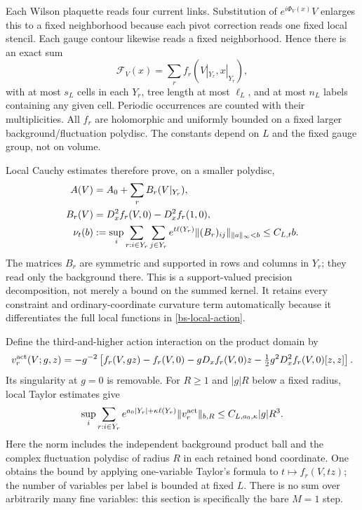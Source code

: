 Each Wilson plaquette reads four current links. Substitution of
$e^{i\Phi_V(x)}V$ enlarges this to a fixed neighborhood because
each pivot correction reads one fixed local stencil. Each gauge
contour likewise reads a fixed neighborhood. Hence there is an
exact sum
\begin{equation}\label{bs-local-action}
 \mathcal F_V(x)=\sum_r f_r(V|_{Y_r},x|_{Y_r}),
\end{equation}
with at most $s_L$ cells in each $Y_r$, tree length at most
$\ell_L$, and at most $n_L$ labels containing any given cell.
Periodic occurrences are counted with their multiplicities.
All $f_r$ are holomorphic and uniformly bounded on a fixed
larger background/fluctuation polydisc. The constants depend
on $L$ and the fixed gauge group, not on volume.

Local Cauchy estimates therefore prove, on a smaller polydisc,
\begin{align}
 A(V)&=A_0+\sum_r B_r(V|_{Y_r}),\label{bs-precision}\\
 B_r(V)&=D_x^2f_r(V,0)-D_x^2f_r(1,0),\notag\\
 \nu_t(b)&:=\sup_i\sum_{r:i\in Y_r}\sum_{j\in Y_r}
 e^{t\ell(Y_r)}\|(B_r)_{ij}\|_{\|a\|_\infty<b}
 \le C_{L,t}b.\label{bs-precision-norm}
\end{align}
The matrices $B_r$ are symmetric and supported in rows and
columns in $Y_r$; they read only the background there.
This is a support-valued precision decomposition, not merely
a bound on the summed kernel. It retains every constraint and
ordinary-coordinate curvature term automatically because it
differentiates the full local functions in \eqref{bs-local-action}.

Define the third-and-higher action interaction on the product
domain by
\begin{equation}\label{bs-action-remainder}
 v_r^{\rm act}(V;g,z)=-g^{-2}\left[
 f_r(V,gz)-f_r(V,0)-gD_xf_r(V,0)z
       -\tfrac12g^2D_x^2f_r(V,0)[z,z]\right].
\end{equation}
Its singularity at $g=0$ is removable. For $R\ge1$ and
$|g|R$ below a fixed radius, local Taylor estimates give
\begin{equation}\label{bs-remainder-norm}
 \sup_i\sum_{r:i\in Y_r} e^{a_0|Y_r|+\kappa\ell(Y_r)}
       \|v_r^{\rm act}\|_{b,R}
       \le C_{L,a_0,\kappa}|g|R^3.
\end{equation}
Here the norm includes the independent background product ball
and the complex fluctuation polydisc of radius $R$ in each
retained bond coordinate. One obtains the bound by applying
one-variable Taylor's formula to $t\mapsto f_r(V,tz)$;
the number of variables per label is bounded at fixed $L$.
There is no sum over arbitrarily many fine variables: this
section is specifically the bare $M=1$ step.

